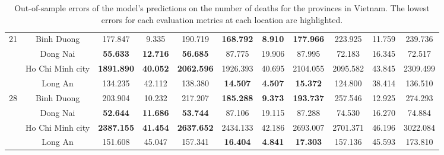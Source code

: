 \begin{landscape}
\begin{table}[!htb]
\begin{tabular}{| c | c | c | c | c | c | c | c | c | c | c |}
        \multirow{4}{*}{21}
            & Binh Duong & 177.847 & 9.335 & 190.719 & \textbf{168.792} & \textbf{8.910} & \textbf{177.966} & 223.925 & 11.759 & 239.736 \\
            & Dong Nai & \textbf{55.633} & \textbf{12.716} & \textbf{56.685} & 87.775 & 19.906 & 87.995 & 72.183 & 16.345 & 72.517 \\
            & Ho Chi Minh city & \textbf{1891.890} & \textbf{40.052} & \textbf{2062.596} & 1926.393 & 40.695 & 2104.055 & 2095.582 & 43.845 & 2309.499 \\
            & Long An & 134.235 & 42.112 & 138.380 & \textbf{14.507} & \textbf{4.507} & \textbf{15.372} & 124.800 & 38.414 & 136.510 \\ \hline

        \multirow{4}{*}{28}
            & Binh Duong & 203.904 & 10.232 & 217.207 & \textbf{185.288} & \textbf{9.373} & \textbf{193.737} & 257.546 & 12.925 & 274.293 \\
            & Dong Nai & \textbf{52.644} & \textbf{11.686} & \textbf{53.744} & 87.106 & 19.115 & 87.288 & 74.530 & 16.270 & 74.884 \\
            & Ho Chi Minh city & \textbf{2387.155} & \textbf{41.454} & \textbf{2637.652} & 2434.133 & 42.186 & 2693.007 & 2701.371 & 46.196 & 3022.084 \\
            & Long An & 151.608 & 45.047 & 157.341 & \textbf{16.404} & \textbf{4.841} & \textbf{17.303} & 157.136 & 45.593 & 173.810 \\ \hline
    \end{tabular}
    \caption{Out-of-sample errors of the model's predictions on the number of deaths for the provinces in Vietnam. The lowest errors for each evaluation metrics at each location are highlighted.}
    \label{tab:errors-vn-provinces-deaths}
\end{table}
\end{landscape}

